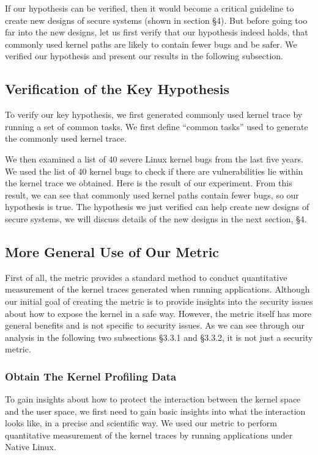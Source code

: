 If our hypothesis can be verified, then it would become a critical guideline to create new designs of secure systems 
(shown in section \S 4). 
But before going too far into the new designs, let us first verify that our hypothesis indeed holds, that commonly used
kernel paths are likely to contain fewer bugs and be safer. We verified our hypothesis and present our results 
in the following subsection.

\subsection{Verification of the Key Hypothesis}
To verify our key hypothesis, we first generated commonly used kernel trace by running a set of common tasks. 
We first define ``common tasks'' used to generate the commonly used kernel trace. 

We then examined a list of 40 severe Linux kernel bugs from the last five years. 
We used the list of 40 kernel bugs to check if there are vulnerabilities lie within the kernel trace we obtained. 
Here is the result of our experiment. 
From this result, we can see that commonly used kernel paths contain fewer bugs, so our hypothesis is true. 
The hypothesis we just verified can help create new designs of secure systems, we will discuss details of the new 
designs in the next section, \S 4.

\subsection{More General Use of Our Metric}
First of all, the metric provides a standard method to conduct quantitative measurement of the kernel traces 
generated when running applications. Although our initial goal of creating the metric is to provide insights into 
the security issues about how to expose the kernel in a safe way. However, the metric itself has more general
benefits and is not specific to security issues. As we can see through our analysis in the following two subsections
\S{3.3.1} and \S{3.3.2}, it is not just a security metric.

\subsubsection{Obtain The Kernel Profiling Data}
To gain insights about how to protect the interaction between the kernel space and the user space, 
we first need to gain basic insights into what the interaction looks like, in a precise and scientific way. 
We used our metric to perform quantitative measurement of the kernel traces by 
running applications under Native Linux. 

